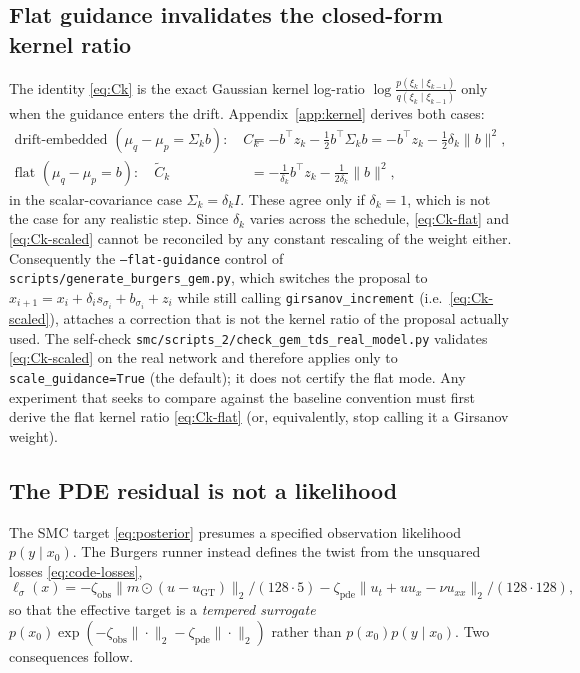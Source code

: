 \documentclass[11pt]{article}
\begin{document}
\subsection{Flat guidance invalidates the closed-form kernel ratio}

The identity \eqref{eq:Ck} is the exact Gaussian kernel log-ratio
$\log\frac{p(\xi_k\mid\xi_{k-1})}{q(\xi_k\mid\xi_{k-1})}$ only when the guidance enters the drift.
Appendix~\ref{app:kernel} derives both cases:
\begin{align}
  \text{drift-embedded }(\mu_q-\mu_p=\Sigma_k b):\quad
  C_k &= -b^\top z_k - \tfrac12 b^\top\Sigma_k b
  = -b^\top z_k - \tfrac12\delta_k\|b\|^2,
  \label{eq:Ck-scaled}\\[2pt]
  \text{flat }(\mu_q-\mu_p=b):\quad
  \widetilde C_k &= -\frac{1}{\delta_k}b^\top z_k - \frac{1}{2\delta_k}\|b\|^2,
  \label{eq:Ck-flat}
\end{align}
in the scalar-covariance case $\Sigma_k=\delta_k I$. These agree only if
$\delta_k=1$, which is not the case for any realistic step. Since $\delta_k$ varies across the
schedule, \eqref{eq:Ck-flat} and \eqref{eq:Ck-scaled} cannot be reconciled by any constant
rescaling of the weight either. Consequently the \texttt{--flat-guidance} control of
\texttt{scripts/generate\_burgers\_gem.py}, which switches the proposal to
$x_{i+1}=x_i+\delta_i s_{\sigma_i}+b_{\sigma_i}+z_i$ while still calling \texttt{girsanov\_increment}
(i.e.\ \eqref{eq:Ck-scaled}), attaches a correction that is not the kernel ratio of the proposal
actually used. The self-check \texttt{smc/scripts\_2/check\_gem\_tds\_real\_model.py} validates
\eqref{eq:Ck-scaled} on the real network and therefore applies only to \texttt{scale\_guidance=True}
(the default); it does not certify the flat mode. Any experiment that seeks to compare against the
baseline convention must first derive the flat kernel ratio \eqref{eq:Ck-flat} (or, equivalently,
stop calling it a Girsanov weight).

\subsection{The PDE residual is not a likelihood}

The SMC target \eqref{eq:posterior} presumes a specified observation likelihood $p(y\mid x_0)$. The
Burgers runner instead defines the twist from the unsquared losses \eqref{eq:code-losses},
\begin{equation}\label{eq:code-ell}
  \ell_\sigma(x) = -\zeta_{\mathrm{obs}}\bigl\|m\odot(u-u_{\mathrm{GT}})\bigr\|_2/(128\cdot5)
  -\zeta_{\mathrm{pde}}\bigl\|u_t+uu_x-\nu u_{xx}\bigr\|_2/(128\cdot128),
\end{equation}
so that the effective target is a \emph{tempered surrogate}
$p(x_0)\exp(-\zeta_{\mathrm{obs}}\|\cdot\|_2-\zeta_{\mathrm{pde}}\|\cdot\|_2)$ rather than
$p(x_0)p(y\mid x_0)$. Two consequences follow.
\end{document}
